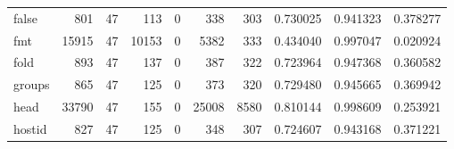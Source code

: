\begin{tabular}{lrrrrrrrrr}
false     &                                 801 &                                              47 &                                            113 &                                             0 &                                            338 &                                          303 &                                           0.730025 &                               0.941323 &                             0.378277 \\
fmt       &                               15915 &                                              47 &                                          10153 &                                             0 &                                           5382 &                                          333 &                                           0.434040 &                               0.997047 &                             0.020924 \\
fold      &                                 893 &                                              47 &                                            137 &                                             0 &                                            387 &                                          322 &                                           0.723964 &                               0.947368 &                             0.360582 \\
groups    &                                 865 &                                              47 &                                            125 &                                             0 &                                            373 &                                          320 &                                           0.729480 &                               0.945665 &                             0.369942 \\
head      &                               33790 &                                              47 &                                            155 &                                             0 &                                          25008 &                                         8580 &                                           0.810144 &                               0.998609 &                             0.253921 \\
hostid    &                                 827 &                                              47 &                                            125 &                                             0 &                                            348 &                                          307 &                                           0.724607 &                               0.943168 &                             0.371221 \\

\end{tabular}

